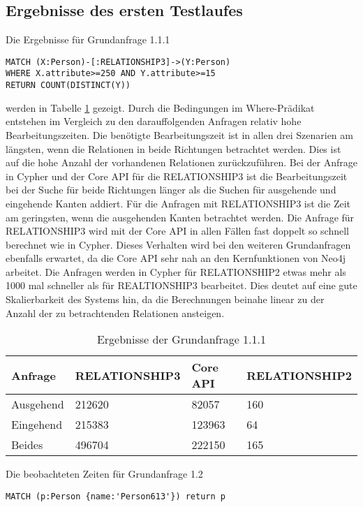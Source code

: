 \subsection{Ergebnisse des ersten Testlaufes}
Die Ergebnisse für Grundanfrage 1.1.1
\begin{Verbatim}[frame=single]
MATCH (X:Person)-[:RELATIONSHIP3]->(Y:Person) 
WHERE X.attribute>=250 AND Y.attribute>=15  
RETURN COUNT(DISTINCT(Y))
\end{Verbatim} 
 werden  in Tabelle \ref{tab:Query1_1} gezeigt. Durch die Bedingungen im Where-Prädikat entstehen im Vergleich zu den darauffolgenden Anfragen relativ hohe Bearbeitungszeiten. Die benötigte Bearbeitungszeit ist in allen drei Szenarien am längsten, wenn die Relationen in beide Richtungen betrachtet werden. Dies ist auf die hohe Anzahl der vorhandenen Relationen zurückzuführen. Bei der Anfrage in Cypher und der Core API für die RELATIONSHIP3  ist die Bearbeitungszeit bei der Suche für beide Richtungen länger als die Suchen für ausgehende und eingehende Kanten addiert. Für die Anfragen mit RELATIONSHIP3 ist die Zeit am geringsten, wenn die ausgehenden Kanten betrachtet werden. \newline
Die Anfrage für RELATIONSHIP3 wird mit der Core API in  allen Fällen fast doppelt so schnell berechnet wie in Cypher. Dieses Verhalten wird bei den weiteren Grundanfragen ebenfalls erwartet, da die Core API sehr nah an den Kernfunktionen von Neo4j arbeitet. \newline
Die Anfragen werden in Cypher für RELATIONSHIP2 etwas mehr als 1000 mal schneller als für REALTIONSHIP3 bearbeitet. Dies deutet auf eine gute Skalierbarkeit des Systems hin, da die Berechnungen beinahe linear zu der Anzahl der zu betrachtenden Relationen ansteigen. 
\FloatBarrier  
\begin{table}[h]
\centering
\begin{tabular}{ |p{3cm}||p{3cm}|p{3cm}|p{3cm}|  }
	\hline
	Anfrage& RELATIONSHIP3 &Core API&RELATIONSHIP2\\
	\hline
	Ausgehend	& 212620  & 82057   & 160\\
	Eingehend   & 215383    &123963&  64\\
	Beides&496704 & 222150&  165\\
	\hline
\end{tabular}
\caption{Ergebnisse der Grundanfrage 1.1.1}
\label{tab:Query1_1}
\end{table}
\FloatBarrier
 \noindent Die beobachteten Zeiten für Grundanfrage 1.2
 \begin{Verbatim}[frame=single]
 MATCH (p:Person {name:'Person613'}) return p
 \end{Verbatim} 

